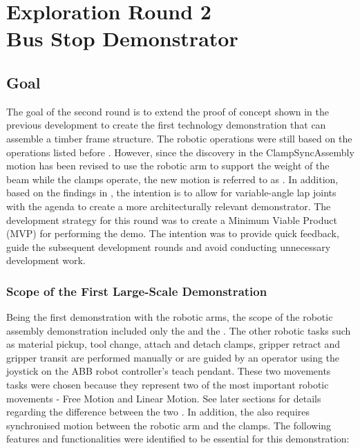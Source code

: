 \chapter[Exploration Round 2 - Bus Stop Demonstrator]{Exploration Round 2\\Bus Stop Demonstrator}
\label{chapter:exploration-round-2}

\section{Goal}
\label{section:exploration-2-goal}

The goal of the second round is to extend the proof of concept shown in the previous development to create the first technology demonstration that can assemble a timber frame structure. The robotic operations were still based on the operations listed before . However, since the discovery in  the ClampSyncAssembly motion has been revised to use the robotic arm to support the weight of the beam while the clamps operate, the new motion is referred to as .
In addition, based on the findings in , the intention is to allow for variable-angle lap joints with the agenda to create a more architecturally relevant demonstrator. 
The development strategy for this round was to create a Minimum Viable Product (MVP) for performing the demo. The intention was to provide quick feedback, guide the subsequent development rounds and avoid conducting unnecessary development work. 

\subsection{Scope of the First Large-Scale Demonstration}
\label{subsection:exploration-2-scope-for-the-first-large-scale-demonstration}

Being the first demonstration with the robotic arms, the scope of the robotic assembly demonstration included only the  and the . The other robotic tasks such as material pickup, tool change, attach and detach clamps, gripper retract and gripper transit are performed manually or are guided by an operator using the joystick on the ABB robot controller’s teach pendant.
These two movements tasks were chosen because they represent two of the most important robotic movements - Free Motion and Linear Motion. See later sections for details regarding the difference between the two . In addition, the  also requires synchronised motion between the robotic arm and the clamps.
The following features and functionalities were identified to be essential for this demonstration:


